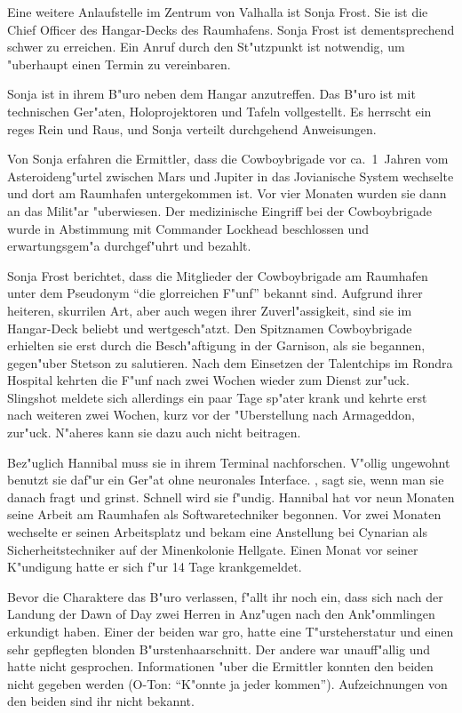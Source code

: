 
Eine weitere Anlaufstelle im Zentrum von Valhalla ist Sonja Frost. Sie ist die Chief Officer des Hangar-Decks des Raumhafens. Sonja Frost ist dementsprechend schwer zu erreichen. Ein Anruf durch den St"utzpunkt ist notwendig, um "uberhaupt einen Termin zu vereinbaren.

Sonja ist in ihrem B"uro neben dem Hangar anzutreffen. Das B"uro ist mit technischen Ger"aten, Holoprojektoren und Tafeln vollgestellt. Es herrscht ein reges Rein und Raus, und Sonja verteilt durchgehend Anweisungen.

Von Sonja erfahren die Ermittler, dass die Cowboybrigade vor ca.~1\half~Jahren vom Asteroideng"urtel zwischen Mars und Jupiter in das Jovianische System wechselte und dort am Raumhafen untergekommen ist. Vor vier Monaten wurden sie dann an das Milit"ar "uberwiesen. Der medizinische Eingriff bei der Cowboybrigade wurde in Abstimmung mit Commander Lockhead beschlossen und erwartungsgem"a\3 durchgef"uhrt und bezahlt.

Sonja Frost berichtet, dass die Mitglieder der Cowboybrigade am Raumhafen unter dem Pseudonym "`die glorreichen F"unf"' bekannt sind. Aufgrund ihrer heiteren, skurrilen Art, aber auch wegen ihrer Zuverl"assigkeit, sind sie im Hangar-Deck beliebt und wertgesch"atzt. Den Spitznamen Cowboybrigade erhielten sie erst durch die Besch"aftigung in der Garnison, als sie begannen, gegen"uber Stetson zu salutieren. Nach dem Einsetzen der Talentchips im Rondra Hospital kehrten die F"unf nach zwei Wochen wieder zum Dienst zur"uck. Slingshot meldete sich allerdings ein paar Tage sp"ater krank und kehrte erst nach weiteren zwei Wochen, kurz vor der "Uberstellung nach Armageddon, zur"uck. N"aheres kann sie dazu auch nicht beitragen.

Bez"uglich Hannibal muss sie in ihrem Terminal nachforschen. V"ollig ungewohnt benutzt sie daf"ur ein Ger"at ohne neuronales Interface. , sagt sie, wenn man sie danach fragt und grinst. Schnell wird sie f"undig. Hannibal hat vor neun Monaten seine Arbeit am Raumhafen als Softwaretechniker begonnen. Vor zwei Monaten wechselte er seinen Arbeitsplatz und bekam eine Anstellung bei Cynarian als Sicherheitstechniker auf der Minenkolonie Hellgate. Einen Monat vor seiner K"undigung hatte er sich f"ur 14 Tage krankgemeldet.

Bevor die Charaktere das B"uro verlassen, f"allt ihr noch ein, dass sich nach der Landung der Dawn of Day zwei Herren in Anz"ugen nach den Ank"ommlingen erkundigt haben. Einer der beiden war gro\3, hatte eine T"ursteherstatur und einen sehr gepflegten blonden B"urstenhaarschnitt. Der andere war unauff"allig und hatte nicht gesprochen. Informationen "uber die Ermittler konnten den beiden nicht gegeben werden (O-Ton: "`K"onnte ja jeder kommen"'). Aufzeichnungen von den beiden sind ihr nicht bekannt.

